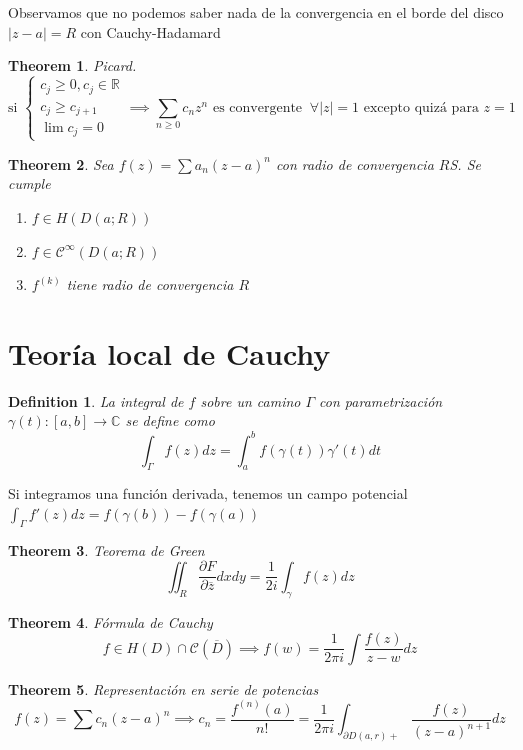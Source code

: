 \documentclass{myclass}
\newtheorem*{definition}{Definition}
\newtheorem*{theorem}{Theorem}
\begin{document}
Observamos que no podemos saber nada de la convergencia en el borde del disco $|z-a|=R$ con Cauchy-Hadamard

\begin{theorem}
Picard. 
\[
\text{si } \begin{cases}
  c_j\ge 0, c_j\in \mathbb{R} \\
  c_j\ge c_{j+1} \\
  \lim c_j = 0
\end{cases}
\implies \sum_{n\ge 0} c_nz^n \text{ es convergente } \ \forall |z|=1 \text{ excepto quizá para } z=1
\] 
\end{theorem}

\begin{theorem}
Sea $f(z) = \sum a_n(z-a)^n$ con radio de convergencia $R$S. Se cumple
 \begin{enumerate}[topsep=-6pt, itemsep=0pt]
  \item $f\in H(D(a;R))$
  \item $f\in \mathcal{C}^\infty(D(a;R))$ 
  \item $f^{(k)}$ tiene radio de convergencia $R$
\end{enumerate}
\end{theorem}

\section{Teoría local de Cauchy}
\begin{definition}
La integral de $f$ sobre un camino $\Gamma$ con parametrización $\gamma(t):[a, b]\to \mathbb{C}$ se define como
\[
\int_\Gamma f(z)dz = \int_a^b f(\gamma(t))\gamma'(t)dt
\] 
\end{definition}

Si integramos una función derivada, tenemos un campo potencial $\int_\Gamma f'(z)dz = f(\gamma(b))-f(\gamma(a)) $

\begin{theorem}
Teorema de Green
\[
  \iint_R \frac{\partial F}{\partial \overline{z}}dxdy = \frac{1}{2i}\int_\gamma f(z)dz
\] 
\end{theorem}

\begin{theorem}
Fórmula de Cauchy
\[
f\in H(D)\cap \mathcal{C}(\overline{D}) \implies f(w) = \frac{1}{2\pi i}\int \frac{f(z)}{z-w}dz
\] 
\end{theorem}

\begin{theorem}
Representación en serie de potencias
\[
f(z) = \sum c_n(z-a)^n \implies c_n = \frac{f^{(n)}(a)}{n!} = \frac{1}{2\pi i} \int_{\partial D(a, r)+} \frac{f(z)}{(z-a)^{n+1}}dz
\] 
\end{theorem}
\end{document}
